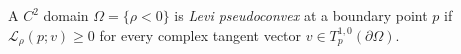 
A $C^2$ domain $\Omega=\{\rho<0\}$ is \emph{Levi pseudoconvex} at a boundary point $p$ if $\mathcal L_\rho(p;v)\ge0$ for every complex tangent vector $v\in T_p^{1,0}(\partial\Omega)$.
